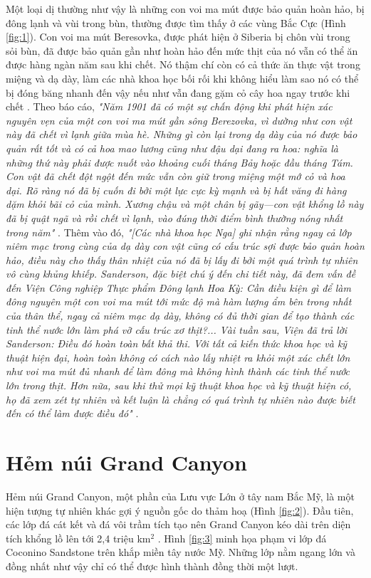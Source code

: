 \documentclass[10pt,twocolumn,letterpaper]{article}
\begin{document}
Một loại dị thường như vậy là những con voi ma mút được bảo quản hoàn hảo, bị đông lạnh và vùi trong bùn, thường được tìm thấy ở các vùng Bắc Cực (Hình \ref{fig:1}). Con voi ma mút Beresovka, được phát hiện ở Siberia bị chôn vùi trong sỏi bùn, đã được bảo quản gần như hoàn hảo đến mức thịt của nó vẫn có thể ăn được hàng ngàn năm sau khi chết. Nó thậm chí còn có cả thức ăn thực vật trong miệng và dạ dày, làm các nhà khoa học bối rối khi không hiểu làm sao nó có thể bị đóng băng nhanh đến vậy nếu như vẫn đang gặm cỏ cây hoa ngay trước khi chết \cite{17}. Theo báo cáo, \textit{"Năm 1901 đã có một sự chấn động khi phát hiện xác nguyên vẹn của một con voi ma mút gần sông Berezovka, vì dường như con vật này đã chết vì lạnh giữa mùa hè. Những gì còn lại trong dạ dày của nó được bảo quản rất tốt và có cả hoa mao lương cũng như đậu dại đang ra hoa: nghĩa là những thứ này phải được nuốt vào khoảng cuối tháng Bảy hoặc đầu tháng Tám. Con vật đã chết đột ngột đến mức vẫn còn giữ trong miệng một mớ cỏ và hoa dại. Rõ ràng nó đã bị cuốn đi bởi một lực cực kỳ mạnh và bị hất văng đi hàng dặm khỏi bãi cỏ của mình. Xương chậu và một chân bị gãy—con vật khổng lồ này đã bị quật ngã và rồi chết vì lạnh, vào đúng thời điểm bình thường nóng nhất trong năm"} \cite{18}. Thêm vào đó, \textit{"[Các nhà khoa học Nga] ghi nhận rằng ngay cả lớp niêm mạc trong cùng của dạ dày con vật cũng có cấu trúc sợi được bảo quản hoàn hảo, điều này cho thấy thân nhiệt của nó đã bị lấy đi bởi một quá trình tự nhiên vô cùng khủng khiếp. Sanderson, đặc biệt chú ý đến chi tiết này, đã đem vấn đề đến Viện Công nghiệp Thực phẩm Đông lạnh Hoa Kỳ: Cần điều kiện gì để làm đông nguyên một con voi ma mút tới mức độ mà hàm lượng ẩm bên trong nhất của thân thể, ngay cả niêm mạc dạ dày, không có đủ thời gian để tạo thành các tinh thể nước lớn làm phá vỡ cấu trúc xơ thịt?... Vài tuần sau, Viện đã trả lời Sanderson: Điều đó hoàn toàn bất khả thi. Với tất cả kiến thức khoa học và kỹ thuật hiện đại, hoàn toàn không có cách nào lấy nhiệt ra khỏi một xác chết lớn như voi ma mút đủ nhanh để làm đông mà không hình thành các tinh thể nước lớn trong thịt. Hơn nữa, sau khi thử mọi kỹ thuật khoa học và kỹ thuật hiện có, họ đã xem xét tự nhiên và kết luận là chẳng có quá trình tự nhiên nào được biết đến có thể làm được điều đó"} \cite{19}.

\section{Hẻm núi Grand Canyon}

Hẻm núi Grand Canyon, một phần của Lưu vực Lớn ở tây nam Bắc Mỹ, là một hiện tượng tự nhiên khác gợi ý nguồn gốc do thảm hoạ (Hình \ref{fig:2}). Đầu tiên, các lớp đá cát kết và đá vôi trầm tích tạo nên Grand Canyon kéo dài trên diện tích khổng lồ lên tới 2,4 triệu km$^2$ \cite{21}. Hình \ref{fig:3} minh họa phạm vi lớp đá Coconino Sandstone trên khắp miền tây nước Mỹ. Những lớp nằm ngang lớn và đồng nhất như vậy chỉ có thể được hình thành đồng thời một lượt.
\end{document}

